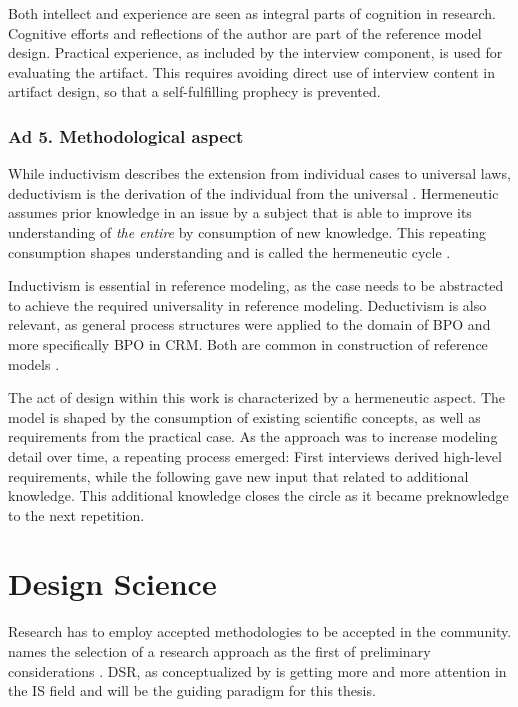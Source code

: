 Both intellect and experience are seen as integral parts of cognition in research. Cognitive efforts and reflections of the author are part of the reference model design. Practical experience, as included by the interview component, is used for evaluating the artifact. This requires avoiding direct use of interview content in artifact design, so that a self-fulfilling prophecy is prevented. 

\subsubsection{Ad 5. Methodological aspect}
While inductivism describes the extension from individual cases to universal laws, deductivism is the derivation of the individual from the universal \citep{seiffert2006einfhrung}. Hermeneutic assumes prior knowledge in an issue by a subject that is able to improve its understanding of \textit{the entire} by consumption of new knowledge. This repeating consumption shapes understanding and is called the hermeneutic cycle \citep{Butler1998}.

Inductivism is essential in reference modeling, as the case needs to be abstracted to achieve the required universality in reference modeling. Deductivism is also relevant, as general process  structures were applied to the domain of BPO and more specifically BPO in CRM. Both are common in construction of reference models \citep{thomas2006mang,Fettke2014meth}.

The act of design within this work is characterized by a hermeneutic aspect. The model is shaped by the consumption of existing scientific concepts, as well as requirements from the practical case. As the approach was to increase modeling detail over time, a repeating process emerged: First interviews derived high-level requirements, while the following gave new input that related to additional knowledge. This additional knowledge closes the circle as it became preknowledge to the next repetition. 

\section{Design Science}
Research has to employ accepted methodologies to be accepted in the community. \citeauthor{creswell2013research} names the selection of a research approach as the first of preliminary considerations \citep{creswell2013research}. \acrfull{DSR}, as conceptualized by \cite{simon1996sciences} is getting more and more attention in the \acrshort{IS} field and will be the guiding paradigm for this thesis. 

